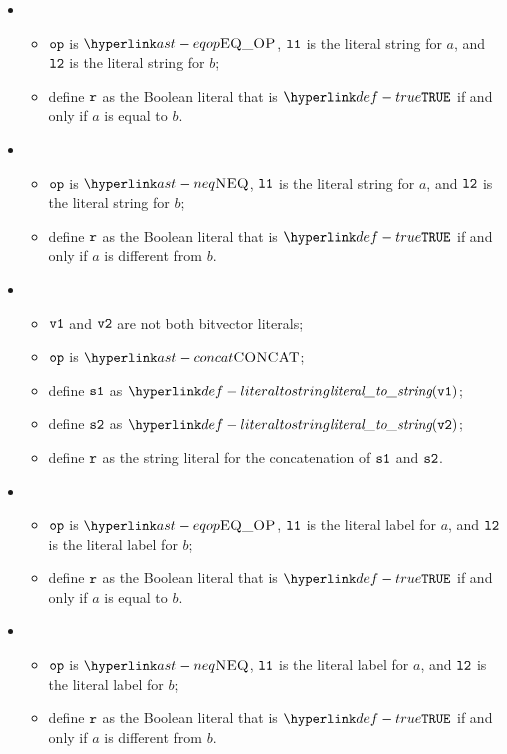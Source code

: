 \begin{itemize}
  \item {}
  \begin{itemize}
    \item $\texttt{op}$ is $\EQOP$, $\texttt{l1}$ is the literal string for $a$, and $\texttt{l2}$ is the literal string for $b$;
    \item define $\texttt{r}$ as the Boolean literal that is $\True$ if and only if $a$ is equal to $b$.
  \end{itemize}

  \item {}
  \begin{itemize}
    \item $\texttt{op}$ is $\NEQ$, $\texttt{l1}$ is the literal string for $a$, and $\texttt{l2}$ is the literal string for $b$;
    \item define $\texttt{r}$ as the Boolean literal that is $\True$ if and only if $a$ is different from $b$.
  \end{itemize}

  \item {}
  \begin{itemize}
    \item $\texttt{v1}$ and $\texttt{v2}$ are not both bitvector literals;
    \item $\texttt{op}$ is $\CONCAT$;
    \item define $\texttt{s1}$ as $\literaltostring(\vvone)$;
    \item define $\texttt{s2}$ as $\literaltostring(\vvtwo)$;
    \item define $\texttt{r}$ as the string literal for the concatenation of $\texttt{s1}$ and $\texttt{s2}$.
  \end{itemize}

  \item {}
  \begin{itemize}
    \item $\texttt{op}$ is $\EQOP$, $\texttt{l1}$ is the literal label for $a$, and $\texttt{l2}$ is the literal label for $b$;
    \item define $\texttt{r}$ as the Boolean literal that is $\True$ if and only if $a$ is equal to $b$.
  \end{itemize}

  \item {}
  \begin{itemize}
    \item $\texttt{op}$ is $\NEQ$, $\texttt{l1}$ is the literal label for $a$, and $\texttt{l2}$ is the literal label for $b$;
    \item define $\texttt{r}$ as the Boolean literal that is $\True$ if and only if $a$ is different from $b$.
  \end{itemize}

\end{itemize}

